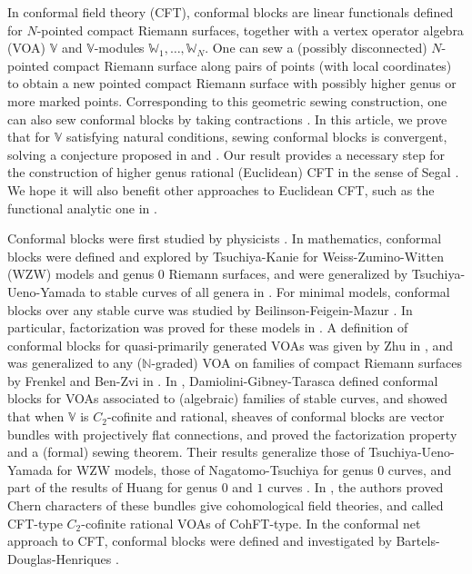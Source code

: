 \documentclass[12pt,a4paper,notitlepage]{article}
\theoremstyle{definition}
\theoremstyle{plain}
\newcommand{\Vbb}{\mathbb V}
\newcommand{\Wbb}{\mathbb W}
\newcommand{\Nbb}{\mathbb N}
\numberwithin{equation}{section}
\begin{document}
In conformal field theory (CFT), conformal blocks are linear functionals defined for $N$-pointed compact Riemann surfaces, together with a vertex operator algebra (VOA) $\Vbb$ and $\Vbb$-modules $\Wbb_1,\dots,\Wbb_N$. One can sew a (possibly disconnected) $N$-pointed compact Riemann surface along pairs of points (with local coordinates) to obtain a new pointed compact Riemann surface with possibly higher genus or more marked points. Corresponding to this geometric sewing construction, one can also sew conformal blocks by taking contractions \cite{Seg88,Vafa87,TK88,TUY89,BFM91,Zhu94,Hua97,Hua05a,Hua05b,NT05,Hua16,DGT19b}. In this article, we prove that for $\Vbb$ satisfying natural conditions,  sewing conformal blocks is convergent, solving a conjecture  proposed in \cite[Conj. 8.1]{Zhu94} and \cite[Problem 2.2]{Hua16}. Our result provides a necessary step for the construction of higher genus rational (Euclidean) CFT in the sense of Segal \cite{Seg88}. We hope it will also benefit other approaches to Euclidean CFT, such as the functional analytic one in \cite{Ten17,Ten19a,Ten19b,Ten19c}.


Conformal blocks were first studied by physicists \cite{BPZ84,FS87,MS89}. In mathematics, conformal blocks were defined and explored by Tsuchiya-Kanie \cite{TK88} for  Weiss-Zumino-Witten (WZW) models and genus $0$ Riemann surfaces, and were generalized by Tsuchiya-Ueno-Yamada to stable curves of all genera in \cite{TUY89}. For minimal models, conformal blocks over any stable curve was studied by  Beilinson-Feigein-Mazur \cite{BFM91}. In particular, factorization was proved for these models in \cite{TUY89,BFM91}.   A definition of conformal blocks for quasi-primarily generated VOAs was given by Zhu in \cite{Zhu94}, and was generalized to any ($\Nbb$-graded) VOA on families of compact Riemann surfaces by Frenkel and Ben-Zvi in \cite{FB04}. In \cite{DGT19a,DGT19b}, Damiolini-Gibney-Tarasca defined conformal blocks for VOAs associated to (algebraic) families of stable curves, and showed that when $\Vbb$ is $C_2$-cofinite and rational,  sheaves of conformal blocks are vector bundles with projectively flat connections, and proved the factorization property and a (formal) sewing theorem. Their results generalize those of Tsuchiya-Ueno-Yamada \cite{TUY89} for WZW models, those of Nagatomo-Tsuchiya \cite{NT05} for genus $0$ curves, and part of the results of Huang for genus $0$ and $1$ curves \cite{Hua95,Hua05a,Hua05b}. In \cite{DGT19c}, the authors proved Chern characters of these bundles give cohomological field theories, and called CFT-type $C_2$-cofinite rational VOAs of CohFT-type. In the conformal net approach to CFT, conformal blocks were defined and investigated by Bartels-Douglas-Henriques \cite{BDH17}.
\end{document}
